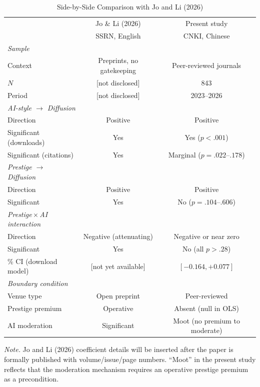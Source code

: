 \documentclass[12pt,a4paper]{article}
\begin{document}
\begin{table}[htbp]
\centering
\caption{Side-by-Side Comparison with Jo and Li (2026)}
\label{tab:compare}
\begin{threeparttable}
\small
\begin{tabular}{p{4.5cm}cc}
\toprule
& Jo \& Li (2026) & Present study \\
& SSRN, English & CNKI, Chinese \\
\midrule
\textit{Sample} & & \\
\quad Context & Preprints, no gatekeeping & Peer-reviewed journals \\
\quad$N$ & [not disclosed] & 843 \\
\quad Period & [not disclosed] & 2023--2026 \\[4pt]
\textit{AI-style $\to$ Diffusion} & & \\
\quad Direction & Positive & Positive \\
\quad Significant (downloads) & Yes & Yes ($p < .001$) \\
\quad Significant (citations) & Yes & Marginal ($p = .022$--$.178$) \\[4pt]
\textit{Prestige $\to$ Diffusion} & & \\
\quad Direction & Positive & Positive \\
\quad Significant & Yes & No ($p = .104$--$.606$) \\[4pt]
\textit{Prestige\,$\times$\,AI interaction} & & \\
\quad Direction & Negative (attenuating) & Negative or near zero \\
\quad Significant & Yes & No (all $p > .28$) \\
\quad 95\% CI (download model) & [not yet available] & $[-0.164, +0.077]$ \\[4pt]
\textit{Boundary condition} & & \\
\quad Venue type & Open preprint & Peer-reviewed \\
\quad Prestige premium & Operative & Absent (null in OLS) \\
\quad AI moderation & Significant & Moot (no premium to moderate) \\
\bottomrule
\end{tabular}
\begin{tablenotes}
\footnotesize
\item \textit{Note.} Jo and Li (2026) coefficient details will be inserted
  after the paper is formally published with volume/issue/page numbers.
  ``Moot'' in the present study reflects that the moderation mechanism
  requires an operative prestige premium as a precondition.
\end{tablenotes}
\end{threeparttable}
\end{table}
\end{document}
